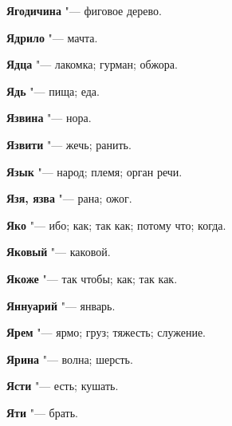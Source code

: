 \begin{mymulticols}
\noindent\textbf{Ягодичина} "--- фиговое дерево. 

\noindent\textbf{Ядрило} "--- мачта. 

\noindent\textbf{Ядца} "--- лакомка; гурман; обжора. 

\noindent\textbf{Ядь} "--- пища; еда. 

\noindent\textbf{Язвина} "--- нора. 

\noindent\textbf{Язвити} "--- жечь; ранить. 

\noindent\textbf{Язык} "--- народ; племя; орган речи. 

\noindent\textbf{Язя, язва} "--- рана; ожог. 

\noindent\textbf{Яко} "--- ибо; как; так как; потому что; когда. 

\noindent\textbf{Яковый} "--- каковой. 

\noindent\textbf{Якоже} "--- так чтобы; как; так как. 

\noindent\textbf{Яннуарий} "--- январь. 

\noindent\textbf{Ярем} "--- ярмо; груз; тяжесть; служение. 

\noindent\textbf{Ярина} "--- волна; шерсть. 

\noindent\textbf{Ясти} "--- есть; кушать. 

\noindent\textbf{Яти} "--- брать. 
\normalfont\end{mymulticols}
\mychapterending



